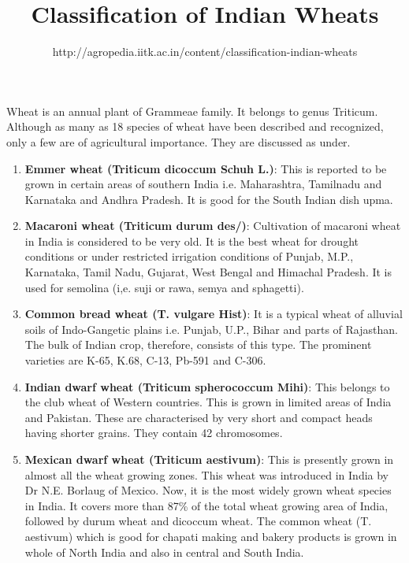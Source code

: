 \documentclass[12]{article}
\title{Classification of Indian Wheats}
\author{http://agropedia.iitk.ac.in/content/classification-indian-wheats}
\date{}
\begin{document}
\maketitle

Wheat is an annual plant of Grammeae family. It belongs to genus Triticum. Although as many as 18 species of wheat have been described and recognized, only a few are of agricultural importance. They are discussed as under.

\begin{enumerate}

\item \textbf{\color{brown}Emmer wheat (Triticum dicoccum Schuh L.)}: This is reported to be grown in certain areas of southern India i.e. Maharashtra, Tamilnadu and Karnataka and Andhra Pradesh. It is good for the South Indian dish upma.

\item \textbf{\color{brown}Macaroni wheat (Triticum durum des/)}: Cultivation of macaroni wheat in India is considered to be very old. It is the best wheat for drought conditions or under restricted irrigation conditions of Punjab, M.P., Karnataka, Tamil Nadu, Gujarat, West Bengal and Himachal Pradesh. It is used for semolina (i,e. suji or rawa, semya and sphagetti).

\item \textbf{\color{brown}Common bread wheat (T. vulgare Hist)}: It is a typical wheat of alluvial soils of Indo-Gangetic plains i.e. Punjab, U.P., Bihar and parts of Rajasthan. The bulk of Indian crop, therefore, consists of this type. The prominent varieties are K-65, K.68, C-13, Pb-591 and C-306.

\item \textbf{\color{brown}Indian dwarf wheat (Triticum spherococcum Mihi)}: This belongs to the club wheat of Western countries. This is grown in limited areas of India and Pakistan. These are characterised by very short and compact heads having shorter grains. They contain 42 chromosomes.

\item \textbf{\color{brown}Mexican dwarf wheat (Triticum aestivum)}: This is presently grown in almost all the wheat growing zones. This wheat was introduced in India by Dr N.E. Borlaug of Mexico. Now, it is the most widely grown wheat species in India. It covers more than 87\% of the total wheat growing area of India, followed by durum wheat  and dicoccum wheat. The common wheat (T. aestivum) which is good for chapati making and bakery products is grown in whole of North India and also in central and South India.

\end{enumerate}
\end{document}
